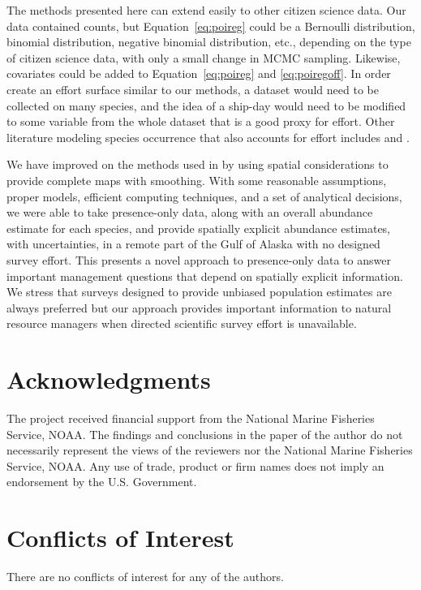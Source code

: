 \documentclass[11pt, titlepage]{article}
\begin{document}
\begin{spacing}{1.9}
\begin{flushleft}
The methods presented here can extend easily to other citizen science data.  Our data contained counts, but Equation~\eqref{eq:poireg} could be a Bernoulli distribution, binomial distribution, negative binomial distribution, etc., depending on the type of citizen science data, with only a small change in MCMC sampling.  Likewise, covariates could be added to Equation~\eqref{eq:poireg} and \eqref{eq:poiregoff}.  In order create an effort surface similar to our methods, a dataset would need to be collected on many species, and the idea of a ship-day would need to be modified to some variable from the whole dataset that is a good proxy for effort.  Other literature modeling species occurrence that also accounts for effort includes \citet{van_strien_opportunistic_2013} and \citet{dennis_efficient_2017}.

We have improved on the methods used in \citet{HimesBoorEtAl2012Stellersealion} by using spatial considerations to provide complete maps with smoothing. With some reasonable assumptions, proper models, efficient computing techniques, and a set of analytical decisions, we were able to take presence-only data, along with an overall abundance estimate for each species, and provide spatially explicit abundance estimates, with uncertainties, in a remote part of the Gulf of Alaska with no designed survey effort.  This presents a novel approach to presence-only data to answer important management questions that depend on spatially explicit information.  We stress that surveys designed to provide unbiased population estimates are always preferred but our approach provides important information to natural resource managers when directed scientific survey effort is unavailable.  
 
\section*{Acknowledgments}

The project received financial support from the National Marine Fisheries Service, NOAA. The findings and conclusions in the paper of the author do not necessarily represent the views of the reviewers nor the National Marine Fisheries Service, NOAA. Any use of trade, product or firm names does not imply an endorsement by the U.S. Government.  

\section*{Conflicts of Interest}
There are no conflicts of interest for any of the authors.


\end{flushleft}
\end{spacing}
\end{document}
